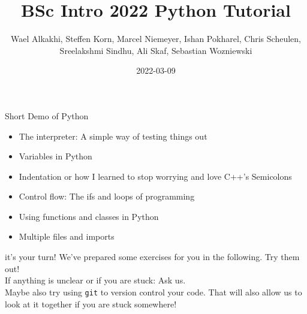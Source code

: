 \documentclass[10pt, aspectratio=169]{beamer}
\title{\Large\color{ugoelogodark} BSc Intro 2022 Python Tutorial}
\author[]{Wael Alkakhi, Steffen Korn, Marcel Niemeyer, Ishan Pokharel, Chris Scheulen, \\ Sreelakshmi Sindhu, Ali Skaf, Sebastian Wozniewski}
\institute[Univ. of G\"ottingen]{II.~Physikalisches Institut, Georg-August-Universit\"at G\"ottingen}
\date{2022-03-09}
\begin{document}
\begin{frame}
\titlepage
\end{frame}

\begin{frame}{Short Demo of Python}
  \begin{itemize}
  \item
    The interpreter: A simple way of testing things out
  \item
    Variables in Python
  \item
    Indentation or how I learned to stop worrying and love C++'s Semicolons
  \item
    Control flow: The ifs and loops of programming
  \item
    Using functions and classes in Python
  \item
    Multiple files and imports
  \end{itemize}

  \begin{center}
     it's your turn! We've prepared some exercises for you in the following. Try them out! \\[0.5\baselineskip]
    If anything is unclear or if you are stuck: Ask us. \\[0.5\baselineskip]
    Maybe also try using \texttt{git} to version control your code. That will also allow us to look at it together if you are stuck somewhere!
  \end{center}
\end{frame}
\end{document}
